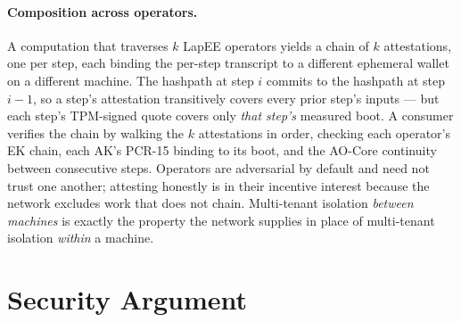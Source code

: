 \documentclass[10pt,a4paper]{article}
\begin{document}
\paragraph{Composition across operators.} A computation that traverses
$k$ LapEE operators yields a chain of $k$ attestations, one per step,
each binding the per-step transcript to a different ephemeral wallet
on a different machine. The hashpath at step $i$ commits to the
hashpath at step $i\!-\!1$, so a step's attestation transitively
covers every prior step's inputs --- but each step's TPM-signed
quote covers only \emph{that step's} measured boot. A consumer
verifies the chain by walking the $k$ attestations in order, checking
each operator's EK chain, each AK's PCR-15 binding to its boot, and
the AO-Core continuity between consecutive steps. Operators are
adversarial by default and need not trust one another; attesting
honestly is in their incentive interest because the network excludes
work that does not chain. Multi-tenant isolation \emph{between
machines} is exactly the property the network supplies in place of
multi-tenant isolation \emph{within} a machine.

\vspace{-0.3em}
\section{Security Argument}
\label{sec:security}
\vspace{-0.3em}
\end{document}
